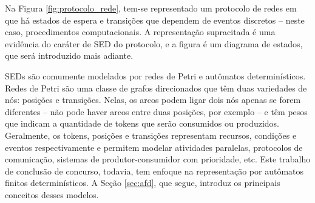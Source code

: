 
Na Figura \ref{fig:protocolo_rede}, tem-se representado um protocolo de redes em que há estados de espera e transições que dependem de eventos discretos -- neste caso, procedimentos computacionais. A representação supracitada é uma evidência do caráter de SED do protocolo, e a figura é um diagrama de estados, que será introduzido mais adiante.

SEDs são comumente modelados por redes de Petri e autômatos determinísticos. Redes de Petri são uma classe de grafos direcionados que têm duas variedades de nós: posições e transições. Nelas, os arcos podem ligar dois nós apenas se forem diferentes -- não pode haver arcos entre duas posições, por exemplo -- e têm pesos que indicam a quantidade de tokens que serão consumidos ou produzidos. Geralmente, os tokens, posições e transições representam recursos, condições e eventos respectivamente e permitem modelar atividades paralelas, protocolos de comunicação, sistemas de produtor-consumidor com prioridade, etc. \cite{petrinets} Este trabalho de conclusão de concurso, todavia, tem enfoque na representação por autômatos finitos determinísticos. A Seção \ref{sec:afd}, que segue, introduz os principais conceitos desses modelos.


